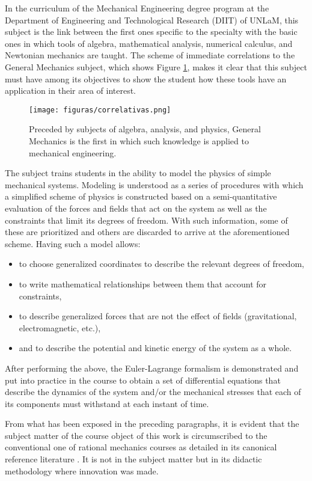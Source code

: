 In the curriculum of the Mechanical Engineering degree program at the Department of Engineering and Technological Research (DIIT) of UNLaM, this subject is the link between the first ones specific to the specialty with the basic ones in which tools of algebra, mathematical analysis, numerical calculus, and Newtonian mechanics are taught. The scheme of immediate correlations to the General Mechanics subject, which shows Figure \ref{fig:correlativas}, makes it clear that this subject must have among its objectives to show the student how these tools have an application in their area of interest.

\begin{figure}[!ht]
\centering
\texttt{[image: figuras/correlativas.png]}
\caption{Preceded by subjects of algebra, analysis, and physics, General Mechanics is the first in which such knowledge is applied to mechanical engineering.}
\label{fig:correlativas}
\end{figure}

The subject trains students in the ability to model the physics of simple mechanical systems. Modeling is understood as a series of procedures with which a simplified scheme of physics is constructed based on a semi-quantitative evaluation of the forces and fields that act on the system as well as the constraints that limit its degrees of freedom. With such information, some of these are prioritized and others are discarded to arrive at the aforementioned scheme. Having such a model allows:
\begin{itemize}
    \item to choose generalized coordinates to describe the relevant degrees of freedom,
    \item to write mathematical relationships between them that account for constraints,
    \item to describe generalized forces that are not the effect of fields (gravitational, electromagnetic, etc.),
    \item and to describe the potential and kinetic energy of the system as a whole.
\end{itemize}


After performing the above, the Euler-Lagrange formalism is demonstrated and put into practice in the course to obtain a set of differential equations that describe the dynamics of the system and/or the mechanical stresses that each of its components must withstand at each instant of time.

From what has been exposed in the preceding paragraphs, it is evident that the subject matter of the course object of this work is circumscribed to the conventional one of rational mechanics courses as detailed in its canonical reference literature \cite{landau}. It is not in the subject matter but in its didactic methodology where innovation was made.

